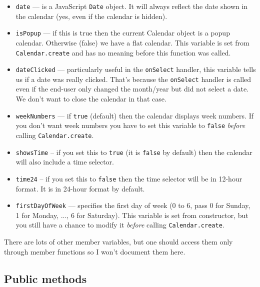 \documentclass[a4paper,10pt]{article}
\begin{document}
\begin{itemize}

\item \texttt{date} --- is a JavaScript \texttt{Date} object.  It will always
reflect the date shown in the calendar (yes, even if the calendar is hidden).

\item \texttt{isPopup} --- if this is true then the current Calendar object is
a popup calendar.  Otherwise (false) we have a flat calendar.  This variable is
set from \texttt{Calendar.create} and has no meaning before this function was
called.

\item \texttt{dateClicked} --- particularly useful in the \texttt{onSelect}
handler, this variable tells us if a date was really clicked.  That's because
the \texttt{onSelect} handler is called even if the end-user only changed the
month/year but did not select a date.  We don't want to close the calendar in
that case.

\item \texttt{weekNumbers} --- if \texttt{true} (default) then the calendar
displays week numbers.  If you don't want week numbers you have to set this
variable to \texttt{false} \emph{before} calling \texttt{Calendar.create}.

\item \texttt{showsTime} -- if you set this to \texttt{true} (it is
\texttt{false} by default) then the calendar will also include a time selector.

\item \texttt{time24} -- if you set this to \texttt{false} then the time
selector will be in 12-hour format.  It is in 24-hour format by default.

\item \texttt{firstDayOfWeek} --- specifies the first day of week (0 to 6, pass
  0 for Sunday, 1 for Monday, ..., 6 for Saturday).  This variable is set from
  constructor, but you still have a chance to modify it \emph{before} calling
  \texttt{Calendar.create}.

\end{itemize}

There are lots of other member variables, but one should access them only
through member functions so I won't document them here.

\subsection{Public methods}
\end{document}

